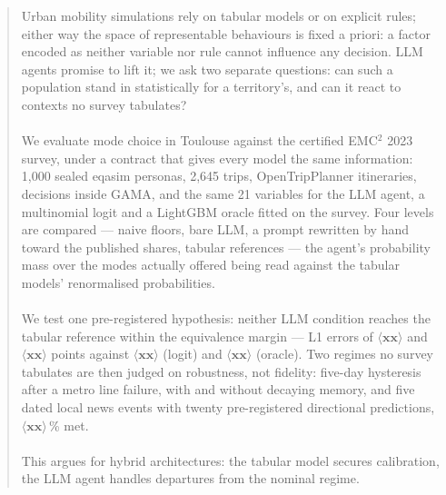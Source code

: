 
\begin{abstract}
Urban mobility simulations rely on tabular models or on explicit rules; either way the space of representable behaviours is fixed a priori: a factor encoded as neither variable nor rule cannot influence any decision. LLM agents promise to lift it; we ask two separate questions: can such a population stand in statistically for a territory's, and can it react to contexts no survey tabulates?
\\\\We evaluate mode choice in Toulouse against the certified EMC$^2$ 2023 survey, under a contract that gives every model the same information: 1,000 sealed eqasim personas, 2,645 trips, OpenTripPlanner itineraries, decisions inside GAMA, and the same 21 variables for the LLM agent, a multinomial logit and a LightGBM oracle fitted on the survey. Four levels are compared --- naive floors, bare LLM, a prompt rewritten by hand toward the published shares, tabular references --- the agent's probability mass over the modes actually offered being read against the tabular models' renormalised probabilities.
\\\\We test one pre-registered hypothesis: neither LLM condition reaches the tabular reference within the equivalence margin --- L1 errors of $\langle \textbf{xx} \rangle$ and $\langle \textbf{xx} \rangle$ points against $\langle \textbf{xx} \rangle$ (logit) and $\langle \textbf{xx} \rangle$ (oracle). Two regimes no survey tabulates are then judged on robustness, not fidelity: five-day hysteresis after a metro line failure, with and without decaying memory, and five dated local news events with twenty pre-registered directional predictions, $\langle \textbf{xx} \rangle$\,\% met.
\\\\This argues for hybrid architectures: the tabular model secures calibration, the LLM agent handles departures from the nominal regime.
\end{abstract}
